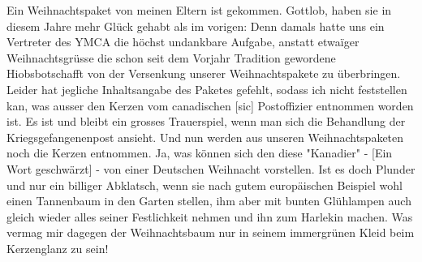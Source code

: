 \def\day{19. November 1942 *}
\mktitle

Ein Weihnachtspaket von meinen Eltern ist gekommen.
Gottlob, haben sie in diesem Jahre mehr Gl\"{u}ck gehabt als im vorigen: Denn damals hatte uns ein Vertreter des YMCA die h\"{o}chst undankbare Aufgabe, anstatt etwaïger Weihnachtsgr\"{u}sse die schon seit dem Vorjahr Tradition gewordene Hiobsbotschafft von der Versenkung unserer Weihnachtspakete zu \"{u}berbringen.
Leider hat jegliche Inhaltsangabe des Paketes gefehlt, sodass ich nicht feststellen kan, was ausser den Kerzen vom canadischen{\color{red} [sic] } Postoffizier entnommen worden ist.
Es ist und bleibt ein grosses Trauerspiel, wenn man sich die Behandlung der Kriegsgefangenenpost ansieht.
Und nun werden aus unseren Weihnachtspaketen noch die Kerzen entnommen.
Ja, was k\"{o}nnen sich den diese "Kanadier" - {\color{red} [Ein Wort geschw\"{a}rzt] } - von einer Deutschen Weihnacht vorstellen.
Ist es doch Plunder und nur ein billiger Abklatsch, wenn sie nach gutem europ\"{a}ischen Beispiel wohl einen Tannenbaum in den Garten stellen, ihm aber mit bunten Gl\"{u}hlampen auch gleich wieder alles seiner Festlichkeit nehmen und ihn zum Harlekin machen.
Was vermag mir dagegen der Weihnachtsbaum nur in seinem immergr\"{u}nen Kleid beim Kerzenglanz zu sein!

\clearpage
